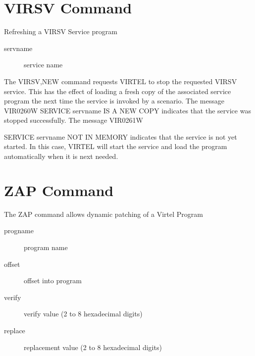 \documentclass[letterpaper,10pt,english]{sphinxmanual}
\begin{document}

\section{VIRSV Command}
\label{\detokenize{audit_operations_ and_performance:virsv-command}}\label{\detokenize{audit_operations_ and_performance:index-32}}
Refreshing a VIRSV Service program

\begin{sphinxVerbatim}[commandchars=\\\{\}]
\end{sphinxVerbatim}
\begin{description}
\item[{servname}] \leavevmode
service name

\end{description}

The VIRSV,NEW command requests VIRTEL to stop the requested VIRSV service. This has the effect of loading a fresh copy of the associated service program the next time the service is invoked by a scenario. The message VIR0260W SERVICE servname IS A NEW COPY indicates that the service was stopped successfully. The message VIR0261W

SERVICE servname NOT IN MEMORY indicates that the service is not yet started. In this case, VIRTEL will start the service and load the  program automatically when it is next needed.


\section{ZAP Command}
\label{\detokenize{audit_operations_ and_performance:index-33}}\label{\detokenize{audit_operations_ and_performance:zap-command}}
The ZAP command allows dynamic patching of a Virtel Program

\begin{sphinxVerbatim}[commandchars=\\\{\}]
\end{sphinxVerbatim}
\begin{description}
\item[{progname}] \leavevmode
program name

\item[{offset}] \leavevmode
offset into program

\item[{verify}] \leavevmode
verify value (2 to 8 hexadecimal digits)

\item[{replace}] \leavevmode
replacement value (2 to 8 hexadecimal digits)

\end{description}
\end{document}
